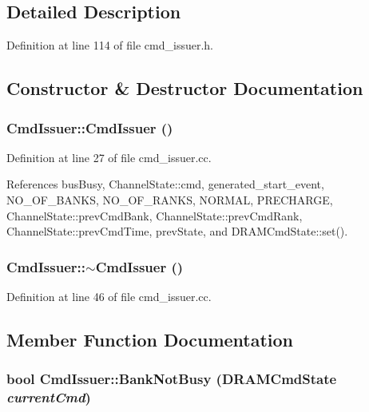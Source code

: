\subsection{Detailed Description}


Definition at line 114 of file cmd\_\-issuer.h.

\subsection{Constructor \& Destructor Documentation}
\subsubsection[{CmdIssuer}]{\setlength{\rightskip}{0pt plus 5cm}CmdIssuer::CmdIssuer ()}\label{classCmdIssuer_4b8fa3fc7c33a7036f8db5c5c59a24a0}




Definition at line 27 of file cmd\_\-issuer.cc.

References busBusy, ChannelState::cmd, generated\_\-start\_\-event, NO\_\-OF\_\-BANKS, NO\_\-OF\_\-RANKS, NORMAL, PRECHARGE, ChannelState::prevCmdBank, ChannelState::prevCmdRank, ChannelState::prevCmdTime, prevState, and DRAMCmdState::set().
\subsubsection[{$\sim$CmdIssuer}]{\setlength{\rightskip}{0pt plus 5cm}CmdIssuer::$\sim$CmdIssuer ()}\label{classCmdIssuer_d1406113645d9e495d9d0220539bdb77}




Definition at line 46 of file cmd\_\-issuer.cc.

\subsection{Member Function Documentation}
\subsubsection[{BankNotBusy}]{\setlength{\rightskip}{0pt plus 5cm}bool CmdIssuer::BankNotBusy ({\bf DRAMCmdState} {\em currentCmd})}\label{classCmdIssuer_5e446a025168cc448e4ad4ed70868b02}




